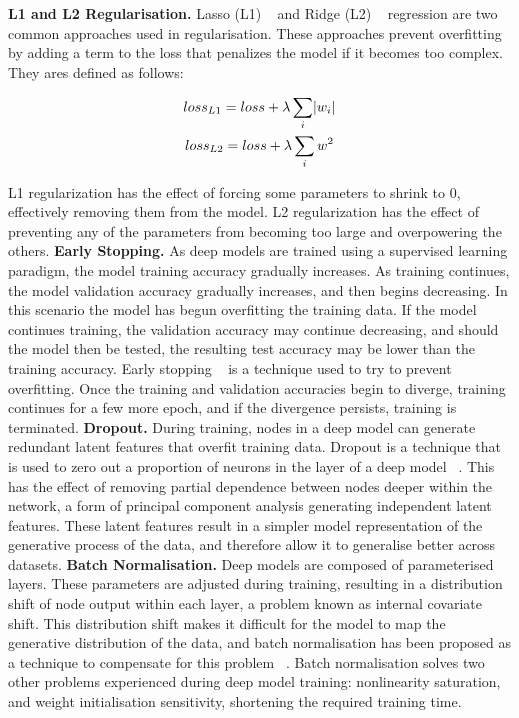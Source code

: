 \textbf{L1 and L2 Regularisation.} Lasso (L1) ~\citep{tibshirani1996regression} and Ridge (L2) ~\citep{hoerl1970ridge} regression are two common approaches used in regularisation. These approaches prevent overfitting by adding a term to the loss that penalizes the model if it becomes too complex. They ares defined as follows:

\begin{subequations}
	\begin{gather}
		loss_{L1} = loss + \lambda\sum_i\abs{w_i}  \\
		loss_{L2} = loss + \lambda\sum_iw^2
	\end{gather}
\end{subequations}

L1 regularization has the effect of forcing some parameters to shrink to 0, effectively removing them from the model. L2 regularization has the effect of preventing any of the parameters from becoming too large and overpowering the others. \newline
\textbf{Early Stopping.} As deep models are trained using a supervised learning paradigm, the model training accuracy gradually increases. As training continues, the model validation accuracy gradually increases, and then begins decreasing. In this scenario the model has begun overfitting the training data. If the model continues training, the validation accuracy may continue decreasing, and should the model then be tested, the resulting test accuracy may be lower than the training accuracy. Early stopping ~\citep{prechelt1998early} is a technique used to try to prevent overfitting. Once the training and validation accuracies begin to diverge, training continues for a few more epoch, and if the divergence persists, training is terminated. \newline
\textbf{Dropout.} During training, nodes in a deep model can generate redundant latent features that overfit training data. Dropout is a technique that is used to zero out a proportion of neurons in the layer of a deep model ~\citep{srivastava2014dropout}. This has the effect of removing partial dependence between nodes deeper within the network, a form of principal component analysis generating independent latent features. These latent features result in a simpler model representation of the generative process of the data, and therefore allow it to generalise better across datasets. \newline
\textbf{Batch Normalisation.} Deep models are composed of parameterised layers. These parameters are adjusted during training, resulting in a distribution shift of node output within each layer, a problem known as internal covariate shift. This distribution shift makes it difficult for the model to map the generative distribution of the data, and batch normalisation has been proposed as a technique to compensate for this problem ~\citep{ioffe2015batch}. Batch normalisation solves two other problems experienced during deep model training: nonlinearity saturation, and weight initialisation sensitivity, shortening the required training time. \newline
